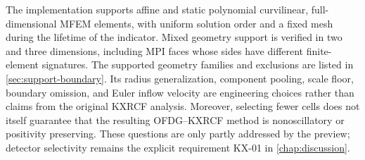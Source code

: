 The implementation supports affine and static polynomial curvilinear, full-dimensional MFEM elements, with uniform solution order and a fixed mesh during the lifetime of the indicator. Mixed
geometry support is verified in two and three dimensions, including MPI faces
whose sides have different finite-element signatures. The supported geometry families and exclusions are listed in \cref{sec:support-boundary}. Its radius generalization,
component pooling, scale floor, boundary omission, and Euler inflow velocity
are engineering choices rather than claims from the original KXRCF analysis.
Moreover, selecting fewer cells does not itself guarantee that the resulting
OFDG--KXRCF method is nonoscillatory or positivity preserving.  These questions
are only partly addressed by the preview; detector selectivity remains the
explicit requirement KX-01 in \cref{chap:discussion}.
